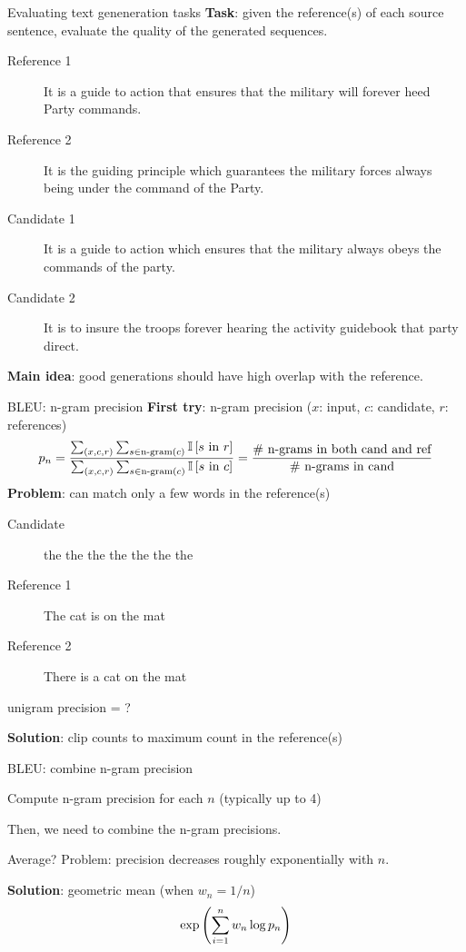 \documentclass[usenames,dvipsnames,notes,11pt,aspectratio=169,hyperref={colorlinks=true, linkcolor=blue}]{beamer}
\begin{document}
\begin{frame}
    {Evaluating text geneneration tasks}
    \textbf{Task}: given the reference(s) of each source sentence, evaluate the quality of the generated sequences.
    \begin{description}
        \item[Reference 1] It is a guide to action that ensures that the military will forever heed Party commands.
        \item[Reference 2] It is the guiding principle which guarantees the military forces always being under the command of the Party. 
        \item[Candidate 1] It is a guide to action which ensures that the military always obeys the commands of the party.
        \item[Candidate 2] It is to insure the troops forever hearing the activity guidebook that party direct.
    \end{description}

    \pause
    \textbf{Main idea}: good generations should have high overlap with the reference.
\end{frame}

\begin{frame}
    {BLEU: n-gram precision}
    \textbf{First try}: n-gram precision ($x$: input, $c$: candidate, $r$: references)
    $$
    p_n = \frac{
        \sum_{(x,c,r)} \sum_{s\in\text{n-gram}(c)} \mathbb{I}\left[ s \text{ in } r \right]
    }
    {
\sum_{(x,c,r)} \sum_{s\in\text{n-gram}(c)} \mathbb{I}\left[ s \text{ in } c \right]
    } = \frac{
        \text{\# n-grams in both cand and ref}
    }{
        \text{\# n-grams in cand}
    }
    $$
    \pause
    \textbf{Problem}: can match only a few words in the reference(s)\\
    \begin{description}
        \item[Candidate] the the the the the the the
        \item[Reference 1] The cat is on the mat
        \item[Reference 2] There is a cat on the mat
    \end{description}
    unigram precision = ?

    \pause
    \textbf{Solution}: clip counts to maximum count in the reference(s)
\end{frame}

\begin{frame}
    {BLEU: combine n-gram precision}

    Compute n-gram precision for each $n$ (typically up to 4)

    Then, we need to combine the n-gram precisions.

    Average? Problem: precision decreases roughly exponentially with $n$.

    \pause
    \textbf{Solution}: geometric mean (when $w_n=1/n$)
    $$
    \exp\left( \sum_{i=1}^n w_n \log p_n \right)
    $$
\end{frame}
\end{document}
